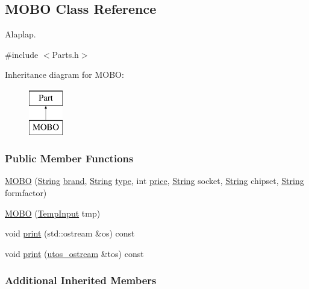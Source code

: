 \subsection{M\+O\+BO Class Reference}
\label{class_m_o_b_o}


Alaplap.  




{\ttfamily \#include $<$Parts.\+h$>$}

Inheritance diagram for M\+O\+BO\+:\begin{figure}[H]
\begin{center}
\leavevmode
\includegraphics[height=2.000000cm]{class_m_o_b_o}
\end{center}
\end{figure}
\subsubsection*{Public Member Functions}
\begin{DoxyCompactItemize}
\item 
\mbox{\hyperlink{class_m_o_b_o_a3185de871765391ae3a0ffe4b0af7e5b}{M\+O\+BO}} (\mbox{\hyperlink{class_string}{String}} \mbox{\hyperlink{class_part_ae06f2fdeb7fbbdb229a7aca151f3e341}{brand}}, \mbox{\hyperlink{class_string}{String}} \mbox{\hyperlink{class_part_a101dbcc5c4b21564df7414c7eb0eae88}{type}}, int \mbox{\hyperlink{class_part_a8e71223aed1da95a974f33d8d6c91bb1}{price}}, \mbox{\hyperlink{class_string}{String}} socket, \mbox{\hyperlink{class_string}{String}} chipset, \mbox{\hyperlink{class_string}{String}} formfactor)
\item 
\mbox{\hyperlink{class_m_o_b_o_ad6b4b2daac75d63d5d7f490d3cfeee6f}{M\+O\+BO}} (\mbox{\hyperlink{struct_temp_input}{Temp\+Input}} tmp)
\item 
void \mbox{\hyperlink{class_m_o_b_o_a3241f425030e01d5b7a192c23af2dbda}{print}} (std\+::ostream \&os) const
\item 
void \mbox{\hyperlink{class_m_o_b_o_a4c78cec3a2a3e4d4480855622f50bd06}{print}} (\mbox{\hyperlink{structutos__ostream}{utos\+\_\+ostream}} \&tos) const
\end{DoxyCompactItemize}
\subsubsection*{Additional Inherited Members}


